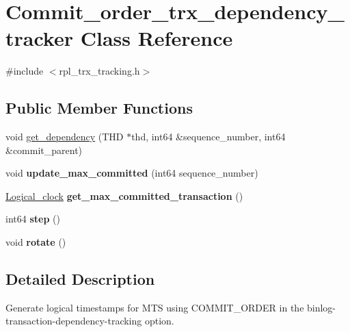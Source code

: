 \hypertarget{classCommit__order__trx__dependency__tracker}{}\section{Commit\+\_\+order\+\_\+trx\+\_\+dependency\+\_\+tracker Class Reference}
\label{classCommit__order__trx__dependency__tracker}


{\ttfamily \#include $<$rpl\+\_\+trx\+\_\+tracking.\+h$>$}

\subsection*{Public Member Functions}
\begin{DoxyCompactItemize}
\item 
void \mbox{\hyperlink{classCommit__order__trx__dependency__tracker_aca0d993a2356d3ec86ed7f07af787a70}{get\+\_\+dependency}} (T\+HD $\ast$thd, int64 \&sequence\+\_\+number, int64 \&commit\+\_\+parent)
\item 
\mbox{\label{classCommit__order__trx__dependency__tracker_a87866a9fea5bc2578eeddb938269fc15}} 
void {\bfseries update\+\_\+max\+\_\+committed} (int64 sequence\+\_\+number)
\item 
\mbox{\label{classCommit__order__trx__dependency__tracker_a133f7b8c78f5c4af333ef33bc7db7d7f}} 
\mbox{\hyperlink{classLogical__clock}{Logical\+\_\+clock}} {\bfseries get\+\_\+max\+\_\+committed\+\_\+transaction} ()
\item 
\mbox{\label{classCommit__order__trx__dependency__tracker_a300d2c4f585f147b49b26815690dbf00}} 
int64 {\bfseries step} ()
\item 
\mbox{\label{classCommit__order__trx__dependency__tracker_a1c90b66967422a5243148c503f99ed8d}} 
void {\bfseries rotate} ()
\end{DoxyCompactItemize}


\subsection{Detailed Description}
Generate logical timestamps for M\+TS using C\+O\+M\+M\+I\+T\+\_\+\+O\+R\+D\+ER in the binlog-\/transaction-\/dependency-\/tracking option. 


